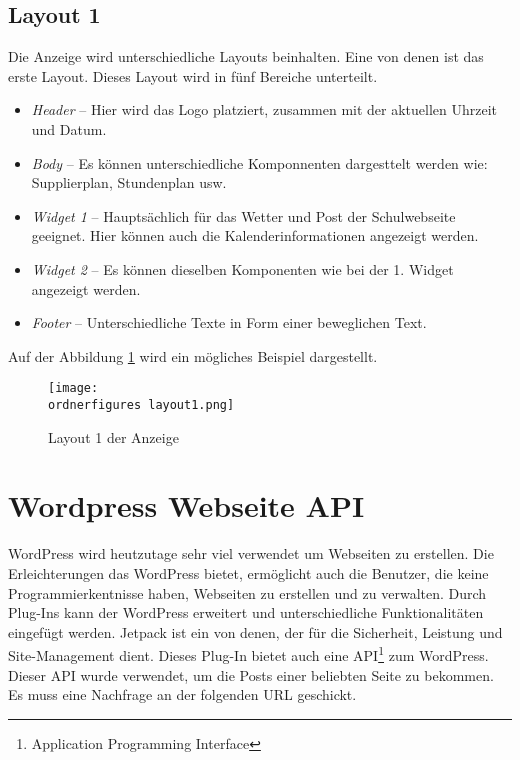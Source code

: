 \subsection{Layout 1}
Die Anzeige wird unterschiedliche Layouts beinhalten. Eine von denen ist das erste Layout. Dieses Layout wird in fünf Bereiche unterteilt.

\begin{itemize}
	\item \textit{Header} – Hier wird das Logo platziert, zusammen mit der aktuellen Uhrzeit und Datum.
	\item \textit{Body} – Es können unterschiedliche Komponnenten dargesttelt werden wie: Supplierplan, Stundenplan usw.
	\item \textit{Widget 1} – Hauptsächlich für das Wetter und Post der Schulwebseite geeignet. Hier können auch die Kalenderinformationen angezeigt werden.
	\item \textit{Widget 2} – Es können dieselben Komponenten wie bei der 1. Widget angezeigt werden.
	\item \textit{Footer} – Unterschiedliche Texte in Form einer beweglichen Text.
	
\end{itemize}

Auf der Abbildung \ref{fi:layout1} wird ein mögliches Beispiel dargestellt.

\begin{figure}[H]
	\centering
	\texttt{[image: \\ordnerfigures layout1.png]}
	\caption{Layout 1 der Anzeige}
	\label{fi:layout1}
\end{figure}


\section{Wordpress Webseite API}


WordPress wird heutzutage sehr viel verwendet um Webseiten zu erstellen. Die Erleichterungen das WordPress bietet, ermöglicht auch die Benutzer, die keine Programmierkentnisse haben, Webseiten zu erstellen und zu verwalten. Durch Plug-Ins kann der WordPress erweitert und unterschiedliche Funktionalitäten eingefügt werden. Jetpack ist ein von denen, der für die Sicherheit, Leistung und Site-Management dient. Dieses Plug-In bietet auch eine API\footnote{Application Programming Interface} zum WordPress. Dieser API wurde verwendet, um die Posts einer beliebten Seite zu bekommen. Es muss eine Nachfrage an der folgenden URL geschickt.


